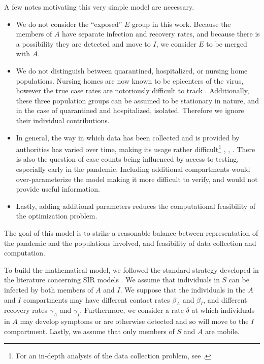 \documentclass[11pt]{article}
\begin{document}
		A few notes motivating this very simple model are necessary.
		\begin{itemize}
			\item
				We do not consider the ``exposed'' $E$ group in this work.
				Because the members of $A$ have separate infection and recovery rates, and because there is a possibility they are detected and move to $I$, we consider $E$ to be merged with $A$.
			\item
				We do not distinguish between quarantined, hospitalized, or nursing home populations.
				Nursing homes are now known to be epicenters of the virus, however the true case rates are notoriously difficult to track \cite{nursing-homes}.
				Additionally, these three population groups can be assumed to be stationary in nature, and in the case of quarantined and hospitalized, isolated.
				Therefore we ignore their individual contributions.
			\item
				In general, the way in which data has been collected and is provided by authorities has varied over time, making its usage rather difficult\footnote{For an in-depth analysis of the data collection problem, see \cite{sara-soremo}.} \cite{messy-data1}, \cite{messy-data2}, \cite{challenges}.
				There is also the question of case counts being influenced by access to testing, especially early in the pandemic.
				Including additional compartments would over-parameterize the model making it more difficult to verify, and would not provide useful information.
			\item
				Lastly, adding additional parameters reduces the computational feasibility of the optimization problem.
		\end{itemize}
		The goal of this model is to strike a reasonable balance between representation of the pandemic and the populations involved, and feasibility of data collection and computation.
	
		To build the mathematical model, we followed the standard strategy developed in the literature concerning SIR models \cite{bio-models}.
		We assume that individuals in $S$ can be infected by both members of $A$ and $I$.
		We suppose that the individuals in the $A$ and $I$ compartments may have different contact rates $\beta_A$ and $\beta_I$, and different recovery rates $\gamma_A$ and $\gamma_I$.
		Furthermore, we consider a rate $\delta$ at which individuals in $A$ may develop symptoms or are otherwise detected and so will move to the $I$ compartment.
		Lastly, we assume that only members of $S$ and $A$ are mobile.
		
\end{document}
